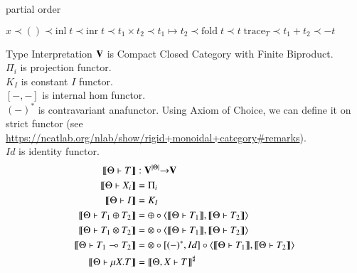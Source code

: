 \documentclass[10pt]{jsarticle}
\newenvironment{bprooftree}
               {\leavevmode\hbox\bgroup}
               {\DisplayProof\egroup}
\newcommand{\semantics}[1]{{\llbracket #1 \rrbracket}}
\newcommand{\precedes}[2]{#1 \;\prec\; #2}
\begin{document}
\begin{itembox}[c]{partial order}
  \begin{center}
    $ x \prec () \prec \text{inl}\;t \prec \text{inr}\;t \prec t_1\times{}t_2 \prec t_1\mapsto{}t_2 \prec \text{fold}\;t \prec t\;\text{trace}_T \prec t_1+t_2 \prec -t $
  \end{center}
\end{itembox}

\begin{itembox}[c]{Type Interpretation}
$\bf{V}$ is Compact Closed Category with Finite Biproduct.\\
$\Pi_i$ is projection functor. \\
$K_I$ is constant $I$ functor. \\
$[-,-]$ is internal hom functor. \\
$(-)^\ast$ is contravariant anafunctor. Using Axiom of Choice, we can define it on strict functor (see \url{https://ncatlab.org/nlab/show/rigid+monoidal+category#remarks}). \\
$Id$ is identity functor.
  \begin{align*}
    \semantics{\Theta \vdash T}                 &: {\bf V}^{|\Theta|} {\bf\rightarrow} {\bf V} \\
    \semantics{\Theta \vdash X_i}               &= \Pi_i \\
    \semantics{\Theta \vdash I}                 &= K_I \\
    \semantics{\Theta \vdash T_1\oplus{}T_2}    &= \oplus\circ\langle\semantics{\Theta \vdash T_1},\semantics{\Theta \vdash T_2}\rangle \\
    \semantics{\Theta \vdash T_1\otimes{}T_2}   &= \otimes\circ\langle\semantics{\Theta \vdash T_1},\semantics{\Theta \vdash T_2}\rangle \\
    \semantics{\Theta \vdash T_1\multimap{}T_2} &= \otimes\circ[(-)^\ast,Id]\circ\langle\semantics{\Theta \vdash T_1},\semantics{\Theta \vdash T_2}\rangle \\
    \semantics{\Theta \vdash \mu{X}.T}          &= \semantics{\Theta,X \vdash T}^\sharp
  \end{align*}
\end{itembox}
\end{document}
